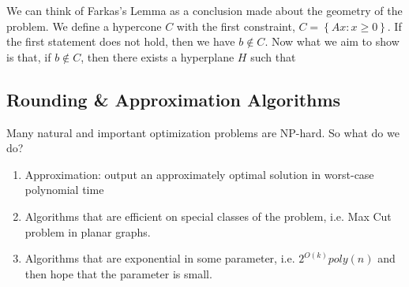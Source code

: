 \documentclass[../notes.tex]{subfiles}
\begin{document}
\begin{blockquote}
We can think of Farkas's Lemma as a conclusion made about the geometry of the problem.
We define a hypercone $ C$ with the first constraint, $C = \left\{ Ax: x \ge 0 \right\} $.
If the first statement does not hold, then we have $ b \notin C $.
Now what we aim to show is that, if $ b \notin C $, then there exists a hyperplane $ H $ such that

    
\end{blockquote}







\subsection{Rounding \& Approximation Algorithms}

Many natural and important optimization problems are NP-hard. So what do we do? 

\begin{enumerate}
    \item Approximation: output an approximately optimal solution in worst-case polynomial time
    \item Algorithms that are efficient on special classes of the problem, i.e. Max Cut problem in planar graphs.
    \item Algorithms that are exponential in some parameter, i.e. $ 2^{O(k)} poly(n) $ and then hope that the parameter is small.
\end{enumerate}
\end{document}
